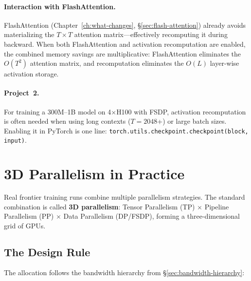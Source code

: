 \paragraph{Interaction with FlashAttention.} FlashAttention (Chapter~\ref{ch:what-changes}, \S\ref{sec:flash-attention}) already avoids materializing the $T \times T$ attention matrix---effectively recomputing it during backward. When both FlashAttention and activation recomputation are enabled, the combined memory savings are multiplicative: FlashAttention eliminates the $O(T^2)$ attention matrix, and recomputation eliminates the $O(L)$ layer-wise activation storage.

\paragraph{Project~2.} For training a 300M--1B model on 4$\times$H100 with FSDP, activation recomputation is often needed when using long contexts ($T = 2048$+) or large batch sizes. Enabling it in PyTorch is one line: \texttt{torch.utils.checkpoint.checkpoint(block, input)}.

\noindent{}


\section{3D Parallelism in Practice}
\label{sec:3d-parallelism}

Real frontier training runs combine multiple parallelism strategies. The standard combination is called \textbf{3D parallelism}: Tensor Parallelism (TP) $\times$ Pipeline Parallelism (PP) $\times$ Data Parallelism (DP/FSDP), forming a three-dimensional grid of GPUs.

\subsection{The Design Rule}

The allocation follows the bandwidth hierarchy from \S\ref{sec:bandwidth-hierarchy}:


